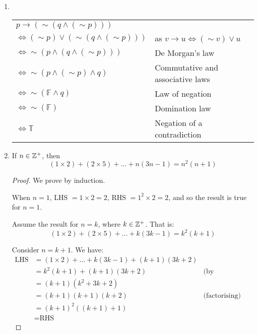 
\begin{enumerate}
\item ~

    \begin{tabular}{ll}
        $p \rightarrow (\sim (q \wedge (\sim p)))$ & \\
        $\Leftrightarrow(\sim p) \vee (\sim (q \wedge (\sim p)))$ &
            as $v \rightarrow u \Leftrightarrow (\sim v) \vee u$ \\
        $\Leftrightarrow\sim(p \wedge (q \wedge (\sim p)))$ &
            De Morgan's law \\
        $\Leftrightarrow\sim(p \wedge (\sim p) \wedge q)$ &
            Commutative and associative laws \\
        $\Leftrightarrow\sim(\mathbb{F} \wedge q)$ & Law of negation \\
        $\Leftrightarrow\sim(\mathbb{F})$ & Domination law \\
        $\Leftrightarrow\mathbb{T}$ & Negation of a contradiction \\
    \end{tabular}

\item
    \begin{theorem}
        If $n \in \mathbb{Z}^+$, then
        $$(1 \times 2) + (2 \times 5) + \dots + n(3n-1) = n^2(n+1)$$
    \end{theorem}
    \begin{proof}
        We prove by induction.

        When $n = 1$, LHS $= 1 \times 2 = 2$, RHS $= 1^2 \times 2 = 2$,
        and so the result is true for $n=1$.

        Assume the result for $n=k$, where $k \in \mathbb{Z}^+$. That is:
        $$(1 \times 2) + (2 \times 5) + \dots + k(3k-1) = k^2(k+1)$$

        Consider $n = k+1$. We have:
        \begin{align*}
            \textrm{LHS} &= (1 \times 2) + \dots + k(3k-1) + (k+1)(3k+2) \\
            &= k^2(k+1) + (k+1)(3k+2) & \textrm{(by assumption)} \\
            &= (k+1)(k^2 + 3k + 2) \\
            &= (k+1)(k+1)(k+2) & \textrm{(factorising)} \\
            &= (k+1)^2((k+1)+1) \\
            &= \textrm{RHS}
        \end{align*}


\end{proof}
\end{enumerate}
